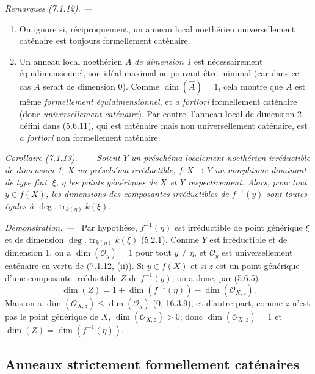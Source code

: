 \documentclass[10pt,oneside]{book}
\newenvironment{corollary}[1][]{%
  \par\medskip\noindent\itshape Corollaire (#1). ---\ }{\par}
\newenvironment{remarks}[1][]{%
  \par\medskip\noindent\itshape Remarques (#1). ---\ }{\par}
\newenvironment{proof}{%
  \par\medskip\noindent\textit{Démonstration. ---\ }}{\par}
\begin{document}
\begin{remarks}[7.1.12]
\label{IV.2.s7.1.12-fr}
\begin{enumerate}
\item[(i)] On ignore si, réciproquement, un anneau local noethérien
universellement caténaire est toujours formellement caténaire.
\item[(ii)] Un anneau local noethérien $A$ \emph{de dimension 1} est nécessairement
équidimensionnel, son idéal maximal ne pouvant être minimal (car dans ce
cas $A$ serait de dimension 0). Comme $\dim(\widehat A)=1$, cela montre que
$A$ est même \emph{formellement équidimensionnel}, et \emph{a fortiori}
formellement caténaire (donc \emph{universellement caténaire}). Par contre,
l'anneau local de dimension 2 défini dans (5.6.11), qui est caténaire mais
non universellement caténaire, est \emph{a fortiori} non formellement
caténaire.
\end{enumerate}
\end{remarks}

\begin{corollary}[7.1.13]
\label{IV.2.s7.1.13-fr}
Soient $Y$ un préschéma localement noethérien irréductible de dimension 1,
$X$ un préschéma irréductible, $f:X\to Y$ un morphisme dominant de type
fini, $\xi$, $\eta$ les points génériques de $X$ et $Y$ respectivement.
Alors, pour tout $y\in f(X)$, les dimensions des composantes irréductibles
de $f^{-1}(y)$ sont toutes égales à
$\deg.\operatorname{tr}_{k(\eta)}k(\xi)$.
\end{corollary}

\begin{proof}
Par hypothèse, $f^{-1}(\eta)$ est irréductible de point générique $\xi$ et
de dimension $\deg.\operatorname{tr}_{k(\eta)}k(\xi)$ (5.2.1). Comme $Y$
est irréductible et de dimension 1, on a $\dim(\mathscr O_y)=1$ pour tout
$y\neq\eta$, et $\mathscr O_y$ est universellement caténaire en vertu de
(7.1.12, (ii)). Si $y\in f(X)$ et si $z$ est un point générique d'une
composante irréductible $Z$ de $f^{-1}(y)$, on a donc, par (5.6.5)
\[
\dim(Z)=1+\dim(f^{-1}(\eta))-\dim(\mathscr O_{X,z}).
\]
Mais on a $\dim(\mathscr O_{X,z})\leqslant\dim(\mathscr O_y)$ (0,
16.3.9), et d'autre part, comme $z$ n'est pas le point générique de $X$,
$\dim(\mathscr O_{X,z})>0$; donc $\dim(\mathscr O_{X,z})=1$ et
$\dim(Z)=\dim(f^{-1}(\eta))$.
\end{proof}

\subsection{Anneaux strictement formellement caténaires}
\label{subsection:IV.7.2-fr}
\end{document}
